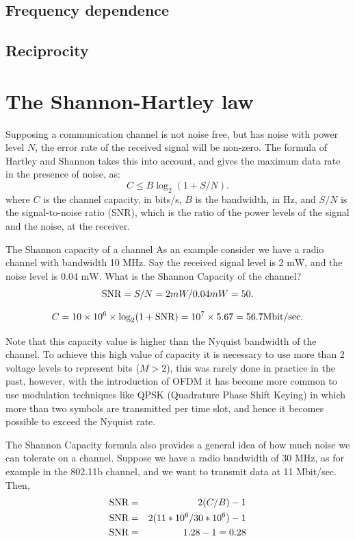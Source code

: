 \subsection{Frequency dependence}

\subsection{Reciprocity}



\section{The Shannon-Hartley law}\label{shannonhartley}

Supposing a communication channel is not noise free, but has noise with power level $N$, the
error rate of the received signal will be non-zero. The formula of Hartley and
Shannon takes this into account, and gives the maximum data rate in the presence of noise,
as:
$$
C \leq B \log_{2} (1 + S/N). 
$$
where $C$ is the channel capacity, in bits/s, $B$ is the bandwidth, in Hz, and $S/N$ is the 
signal-to-noise ratio (SNR),
which is the ratio of the power levels of the signal and the noise, 
at the receiver. 

\begin{sbexample}{The Shannon capacity of a channel}%
As an example consider we have a radio channel with bandwidth 10
\textsc{MH}z. Say the received signal level is 2 m\textsc{W}, and the
noise level is 0.04 m\textsc{W}. What is the Shannon Capacity of the
channel?  
$$ 
\hbox{SNR} = S/N = 2mW / 0.04 mW = 50 .  
$$

$$
C = 10\times 10^{6} \times \log_{2}(1 + \hbox{SNR}) = 10^{7} \times 5.67 = 56.7 \hbox{Mbit/sec} .
$$
\end{sbexample}


Note that this capacity value is higher than the Nyquist bandwidth of
the channel. To achieve this high value of capacity it is necessary to
use more than 2 voltage levels to represent bits ($M > 2$), this was
rarely done in practice in the past, however, with the introduction of
OFDM it has become more common to use modulation techniques like QPSK
(Quadrature Phase Shift Keying) in which more than two symbols are transmitted per time slot,
and hence it becomes possible to exceed the Nyquist rate.

The Shannon Capacity formula also provides a general idea of how much noise we can 
tolerate on a channel. Suppose we have a radio bandwidth of 30 MHz, as for example in the
802.11b channel, and we want to transmit data at 11 Mbit/sec. Then,
\begin{eqnarray}\nonumber
\hbox{SNR} &=& 2(C/B)-1 \\
\nonumber
\hbox{SNR} &=& 2(11*10^{6}/30*10^{6})-1 \\
\nonumber
\hbox{SNR} &=& 1.28-1=0.28
\end{eqnarray}


